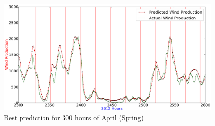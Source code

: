 \begin{figure}[H]
\centering
\includegraphics[width=0.99\linewidth]{billeder/bestPossiblePredictionWindProduction2300-2600_April_Spring.png}
\caption{Best prediction for 300 hours of April (Spring)}
\label{fig:bestWPPredictSpringForDiscussion}
\end{figure}


